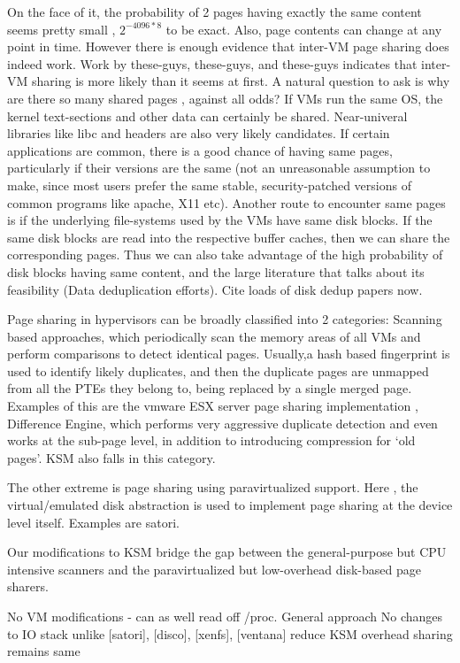 \documentclass[10pt,a4paper]{article}
\begin{document}
On the face of it, the probability of 2 pages having exactly the same content seems pretty small , $2^{-4096*8}$ to be exact. Also, page contents can change at any point in time. However there is enough evidence that inter-VM page sharing does indeed work. Work by these-guys, these-guys, and these-guys indicates that inter-VM sharing is more likely than it seems at first. 
A natural question to ask is why are there so many shared pages , against all odds? If VMs run the same OS, the kernel text-sections and other data can certainly be shared. Near-univeral libraries like libc and headers are also very likely candidates. If certain applications are common, there is a good chance of having same pages, particularly if their versions are the same (not an unreasonable assumption to make, since most users prefer the same stable, security-patched versions of common programs like apache, X11 etc). 
Another route to encounter same pages is if the underlying file-systems used by the VMs have same disk blocks. If the same disk blocks are read into the respective buffer caches, then we can share the corresponding pages. Thus we can also take advantage of the high probability of disk blocks having same content, and the large literature that talks about its feasibility (Data deduplication efforts). Cite loads of disk dedup papers now. 


Page sharing in hypervisors can be broadly classified into 2 categories: Scanning based approaches, which periodically scan the memory areas of all VMs and perform comparisons to detect identical pages. 
Usually,a hash based fingerprint is used to identify likely duplicates, and then the duplicate pages are unmapped from all the PTEs they belong to, being replaced by a single merged page.
Examples of this are the vmware ESX server page sharing implementation , Difference Engine, which performs very aggressive duplicate detection and even works at the sub-page level, in addition to introducing compression for `old pages'. KSM also falls in this category.

The other extreme is page sharing using paravirtualized support. Here , the virtual/emulated disk abstraction is used to implement page sharing at the device level itself. Examples are satori.

Our modifications to KSM bridge the gap between the general-purpose but CPU intensive scanners and the paravirtualized but low-overhead disk-based page sharers.

No VM modifications - can as well read off /proc. 
General approach
No changes to IO stack unlike [satori], [disco], [xenfs], [ventana]
reduce KSM overhead
sharing remains same
\end{document}
